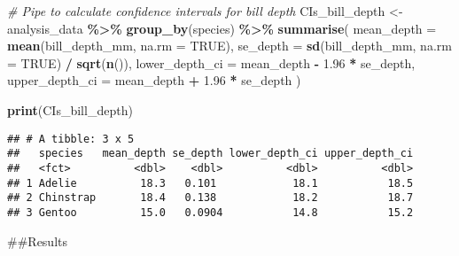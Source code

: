 \documentclass[
]{article}
\newenvironment{Shaded}{\begin{snugshade}}{\end{snugshade}}
\newcommand{\AttributeTok}[1]{\textcolor[rgb]{0.13,0.29,0.53}{#1}}
\newcommand{\CommentTok}[1]{\textcolor[rgb]{0.56,0.35,0.01}{\textit{#1}}}
\newcommand{\ConstantTok}[1]{\textcolor[rgb]{0.56,0.35,0.01}{#1}}
\newcommand{\FloatTok}[1]{\textcolor[rgb]{0.00,0.00,0.81}{#1}}
\newcommand{\FunctionTok}[1]{\textcolor[rgb]{0.13,0.29,0.53}{\textbf{#1}}}
\newcommand{\NormalTok}[1]{#1}
\newcommand{\OtherTok}[1]{\textcolor[rgb]{0.56,0.35,0.01}{#1}}
\newcommand{\SpecialCharTok}[1]{\textcolor[rgb]{0.81,0.36,0.00}{\textbf{#1}}}
\begin{document}
\begin{Shaded}
\begin{Highlighting}[]
\CommentTok{\# Pipe to calculate confidence intervals for bill depth}
\NormalTok{CIs\_bill\_depth }\OtherTok{\textless{}{-}}\NormalTok{ analysis\_data }\SpecialCharTok{\%\textgreater{}\%}
  \FunctionTok{group\_by}\NormalTok{(species) }\SpecialCharTok{\%\textgreater{}\%}
  \FunctionTok{summarise}\NormalTok{(}
    \AttributeTok{mean\_depth =} \FunctionTok{mean}\NormalTok{(bill\_depth\_mm, }\AttributeTok{na.rm =} \ConstantTok{TRUE}\NormalTok{),}
    \AttributeTok{se\_depth =} \FunctionTok{sd}\NormalTok{(bill\_depth\_mm, }\AttributeTok{na.rm =} \ConstantTok{TRUE}\NormalTok{) }\SpecialCharTok{/} \FunctionTok{sqrt}\NormalTok{(}\FunctionTok{n}\NormalTok{()),}
    \AttributeTok{lower\_depth\_ci =}\NormalTok{ mean\_depth }\SpecialCharTok{{-}} \FloatTok{1.96} \SpecialCharTok{*}\NormalTok{ se\_depth,}
    \AttributeTok{upper\_depth\_ci =}\NormalTok{ mean\_depth }\SpecialCharTok{+} \FloatTok{1.96} \SpecialCharTok{*}\NormalTok{ se\_depth}
\NormalTok{  )}

\FunctionTok{print}\NormalTok{(CIs\_bill\_depth)}
\end{Highlighting}
\end{Shaded}

\begin{verbatim}
## # A tibble: 3 x 5
##   species   mean_depth se_depth lower_depth_ci upper_depth_ci
##   <fct>          <dbl>    <dbl>          <dbl>          <dbl>
## 1 Adelie          18.3   0.101            18.1           18.5
## 2 Chinstrap       18.4   0.138            18.2           18.7
## 3 Gentoo          15.0   0.0904           14.8           15.2
\end{verbatim}

\#\#Results
\end{document}
